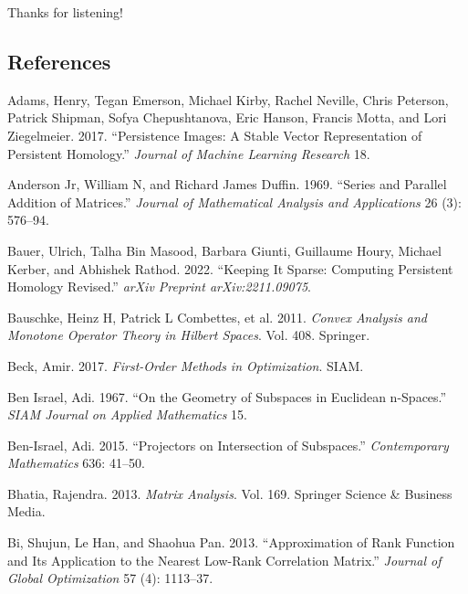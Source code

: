 \documentclass[
  letterpaper,
  DIV=11,
  numbers=noendperiod,
  oneside]{scrartcl}
\newlength{\cslentryspacing}
\begin{document}
Thanks for listening!

\subsection{References}\label{references}

\label{refs}
\setlength{\cslentryspacing}{0em}
\begin{CSLReferences}
Adams, Henry, Tegan Emerson, Michael Kirby, Rachel Neville, Chris
Peterson, Patrick Shipman, Sofya Chepushtanova, Eric Hanson, Francis
Motta, and Lori Ziegelmeier. 2017. {``Persistence Images: A Stable
Vector Representation of Persistent Homology.''} \emph{Journal of
Machine Learning Research} 18.

Anderson Jr, William N, and Richard James Duffin. 1969. {``Series and
Parallel Addition of Matrices.''} \emph{Journal of Mathematical Analysis
and Applications} 26 (3): 576--94.

Bauer, Ulrich, Talha Bin Masood, Barbara Giunti, Guillaume Houry,
Michael Kerber, and Abhishek Rathod. 2022. {``Keeping It Sparse:
Computing Persistent Homology Revised.''} \emph{arXiv Preprint
arXiv:2211.09075}.

Bauschke, Heinz H, Patrick L Combettes, et al. 2011. \emph{Convex
Analysis and Monotone Operator Theory in Hilbert Spaces}. Vol. 408.
Springer.

Beck, Amir. 2017. \emph{First-Order Methods in Optimization}. SIAM.

Ben Israel, Adi. 1967. {``On the Geometry of Subspaces in Euclidean
n-Spaces.''} \emph{SIAM Journal on Applied Mathematics} 15.

Ben-Israel, Adi. 2015. {``Projectors on Intersection of Subspaces.''}
\emph{Contemporary Mathematics} 636: 41--50.

Bhatia, Rajendra. 2013. \emph{Matrix Analysis}. Vol. 169. Springer
Science \& Business Media.

Bi, Shujun, Le Han, and Shaohua Pan. 2013. {``Approximation of Rank
Function and Its Application to the Nearest Low-Rank Correlation
Matrix.''} \emph{Journal of Global Optimization} 57 (4): 1113--37.


\end{CSLReferences}
\end{document}
